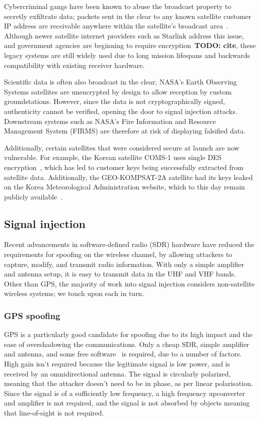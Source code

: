 Cybercriminal gangs have been known to abuse the broadcast property to secretly exfiltrate data; packets sent in the clear to any known satellite customer IP address are receivable anywhere within the satellite's broadcast area~\cite{satellite_apt}.
Although newer satellite internet providers such as Starlink address this issue, and government agencies are beginning to require encryption~\textbf{TODO: cite}, these legacy systems are still widely used due to long mission lifespans and backwards compatibility with existing receiver hardware.

Scientific data is often also broadcast in the clear; NASA's Earth Observing Systems satellites are unencrypted by design to allow reception by custom groundstations.
However, since the data is not cryptographically signed, authenticity cannot be verified, opening the door to signal injection attacks.
Downstream systems such as NASA's Fire Information and Resource Management System (FIRMS) are therefore at risk of displaying falsified data.

Additionally, certain satellites that were considered secure at launch are now vulnerable.
For example, the Korean satellite COMS-1 uses single DES encryption~\cite{lrit-key-dec}, which has led to customer keys being successfully extracted from satellite data.
Additionally, the GEO-KOMPSAT-2A satellite had its keys leaked on the Korea Meteorological Administration website, which to this day remain publicly available~\cite{xrit-rx}.

\subsection{Signal injection}

Recent advancements in software-defined radio (SDR) hardware have reduced the requirements for spoofing on the wireless channel, by allowing attackers to capture, modify, and transmit radio information.
With only a simple amplifier and antenna setup, it is easy to transmit data in the UHF and VHF bands.
Other than GPS, the majority of work into signal injection considers non-satellite wireless systems; we touch upon each in turn.

\subsubsection{GPS spoofing}

GPS is a particularly good candidate for spoofing due to its high impact and the ease of overshadowing the communications.
Only a cheap SDR, simple amplifier and antenna, and some free software~\cite{gps-sdr-sim} is required, due to a number of factors.
High gain isn't required because the legitimate signal is low power, and is received by an omnidirectional antenna.
The signal is circularly polarized, meaning that the attacker doesn't need to be in phase, as per linear polarisation.
Since the signal is of a sufficiently low frequency, a high frequency upconverter and amplifier is not required, and the signal is not absorbed by objects meaning that line-of-sight is not required.

